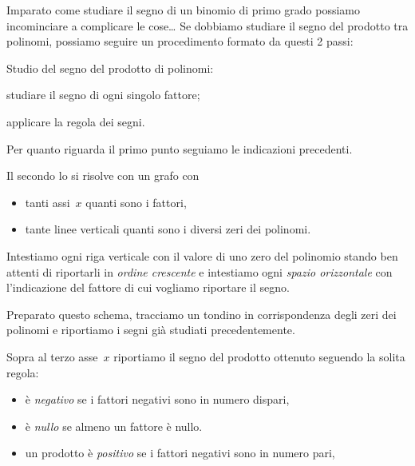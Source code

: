 Imparato come studiare il segno di un binomio di primo grado possiamo 
incominciare a complicare le cose\dots
Se dobbiamo studiare il segno del prodotto tra polinomi, possiamo 
seguire un procedimento formato da questi 2 passi:

\begin{procedura}
 Studio del segno del prodotto di polinomi:
\begin{enumeratea}
\item studiare il segno di ogni singolo fattore;
\item applicare la regola dei segni.
\end{enumeratea}
\end{procedura}

Per quanto riguarda il primo punto seguiamo le indicazioni precedenti. 

Il secondo lo si risolve con un grafo con
\begin{itemize} [noitemsep]
\item tanti assi~\(x\) quanti sono i fattori, 
\item tante linee verticali quanti sono i diversi zeri dei polinomi. 
\end{itemize}

Intestiamo ogni riga verticale con il valore di uno zero del polinomio
stando ben attenti di riportarli in \emph{ordine crescente} e intestiamo ogni 
\emph{spazio orizzontale} con l'indicazione del fattore di cui vogliamo 
riportare il segno. 

Preparato questo schema, tracciamo un tondino in corrispondenza degli zeri 
dei polinomi e riportiamo i segni già studiati precedentemente. 

Sopra al terzo asse~\(x\) riportiamo il segno del prodotto ottenuto 
seguendo la solita regola: 
\begin{itemize} [noitemsep]
\item è \emph{negativo} se i fattori negativi sono in numero dispari, 
\item è \emph{nullo} se almeno un fattore è nullo.
\item un prodotto è \emph{positivo} se i fattori negativi sono in numero 
pari, 
\end{itemize}

